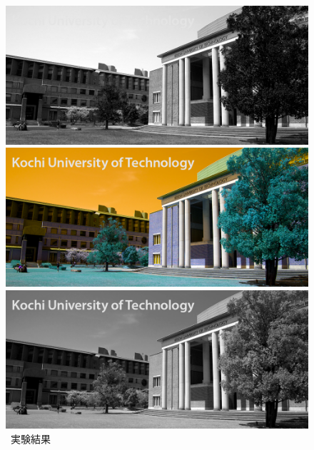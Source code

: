\begin{figure}[H]
\begin{minipage}[b]{.19\textwidth}
    \end{minipage}
    \begin{minipage}[b]{.19\textwidth}
        \centering
        \includegraphics[keepaspectratio,width=\textwidth]{../../Figures/05_13_b.png}
    \end{minipage}
    \begin{minipage}[b]{.19\textwidth}
        \centering
        \includegraphics[keepaspectratio,width=\textwidth]{../../Figures/05_14_change.png}
    \end{minipage}
    \caption{\kadaiaa\ 実験結果}
    \vsp
    \begin{minipage}[b]{.23\textwidth}
        \centering
        \includegraphics[keepaspectratio,width=\textwidth]{../../Figures/05_21_gimg.png}

\end{minipage}
\end{figure}
